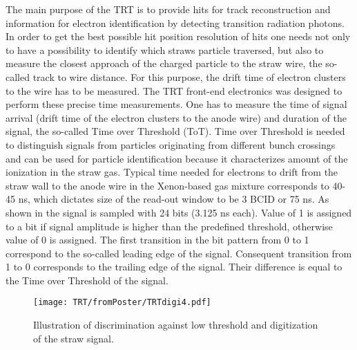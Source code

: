 
The main purpose of the TRT is to provide hits for track reconstruction and information for electron identification by detecting transition radiation photons.
In order to get the best possible hit position resolution of hits one needs not only to have a possibility to identify which straws particle traversed,
but also to measure the closest approach of the charged particle to the straw wire, the so-called track to wire distance. 
For this purpose, the drift time of electron clusters to the wire has to be measured.
The TRT front-end electronics was designed to perform these precise time measurements.
One has to measure the time of signal arrival (drift time of the electron clusters to the anode wire) and duration of the signal, the so-called Time over Threshold (ToT).
Time over Threshold is needed to distinguish signals from particles originating from different bunch crossings 
and can be used for particle identification because it characterizes amount of the ionization in the straw gas.
Typical time needed for electrons to drift from the straw wall to the anode wire in the Xenon-based gas mixture corresponds to 40-45 ns, which dictates size of the read-out window to be 
3 BCID or 75 ns. As shown in  the signal is sampled with 24 bits (3.125 ns each). 
Value of 1 is assigned to a bit if signal amplitude is higher than the predefined threshold, 
otherwise value of 0 is assigned. The first transition in the bit pattern from 0 to 1 correspond to the so-called leading edge of the signal. Consequent transition from 1 to 0 
corresponds to the trailing edge of the signal. Their difference is equal to the Time over Threshold of the signal. 

\begin{figure}
\begin{center}
 \texttt{[image: TRT/fromPoster/TRTdigi4.pdf]}
\caption{Illustration of discrimination against low threshold and digitization of the straw signal.}
\label{fig:pulseDigitization}
\end{center}
\end{figure}

